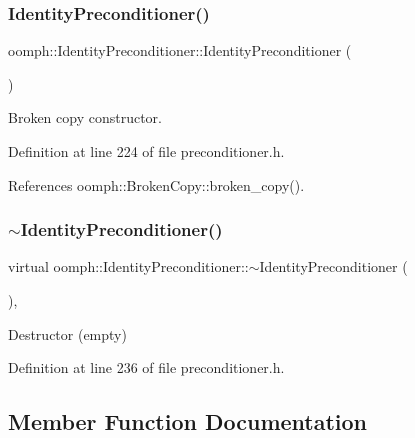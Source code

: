 \subsubsection{\texorpdfstring{Identity\+Preconditioner()}{IdentityPreconditioner()}\hspace{0.1cm}{\footnotesize\ttfamily [2/2]}}
{\footnotesize\ttfamily oomph\+::\+Identity\+Preconditioner\+::\+Identity\+Preconditioner (\begin{DoxyParamCaption}\item[{const \hyperlink{classoomph_1_1IdentityPreconditioner}{Identity\+Preconditioner} \&}]{ }\end{DoxyParamCaption})\hspace{0.3cm}{\ttfamily [inline]}}



Broken copy constructor. 



Definition at line 224 of file preconditioner.\+h.



References oomph\+::\+Broken\+Copy\+::broken\+\_\+copy().

\mbox{\label{classoomph_1_1IdentityPreconditioner_a3e24cbb18f15b0ee32856b69a04e00e8}} 
\subsubsection{\texorpdfstring{$\sim$\+Identity\+Preconditioner()}{~IdentityPreconditioner()}}
{\footnotesize\ttfamily virtual oomph\+::\+Identity\+Preconditioner\+::$\sim$\+Identity\+Preconditioner (\begin{DoxyParamCaption}{ }\end{DoxyParamCaption})\hspace{0.3cm}{\ttfamily [inline]}, {\ttfamily [virtual]}}



Destructor (empty) 



Definition at line 236 of file preconditioner.\+h.



\subsection{Member Function Documentation}
\mbox{\label{classoomph_1_1IdentityPreconditioner_a1a87e0d6233505b9f7d114c7d666ef11}} 
